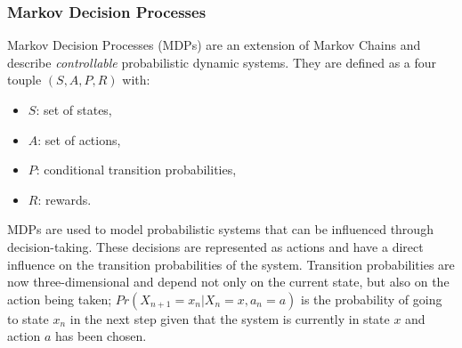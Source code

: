 \subsubsection{Markov Decision Processes}

Markov Decision Processes (MDPs) are an extension of Markov Chains and describe \textit{controllable} probabilistic dynamic systems. They are defined as a four touple $(S,A,P,R)$ with:
\begin{itemize}
\item $S$: set of states,
\item $A$: set of actions,
\item $P$: conditional transition probabilities,
\item $R$: rewards.
\end{itemize}


MDPs are used to model probabilistic systems that can be influenced through decision-taking. These decisions are represented as actions and have a direct influence on the transition probabilities of the system. Transition probabilities are now three-dimensional and depend not only on the current state, but also on the action being taken; $Pr(X_{n+1}=x_n|X_n=x,a_n=a)$ is the probability of going to state $x_n$ in the next step given that the system is currently in state $x$ and action $a$ has been chosen.


